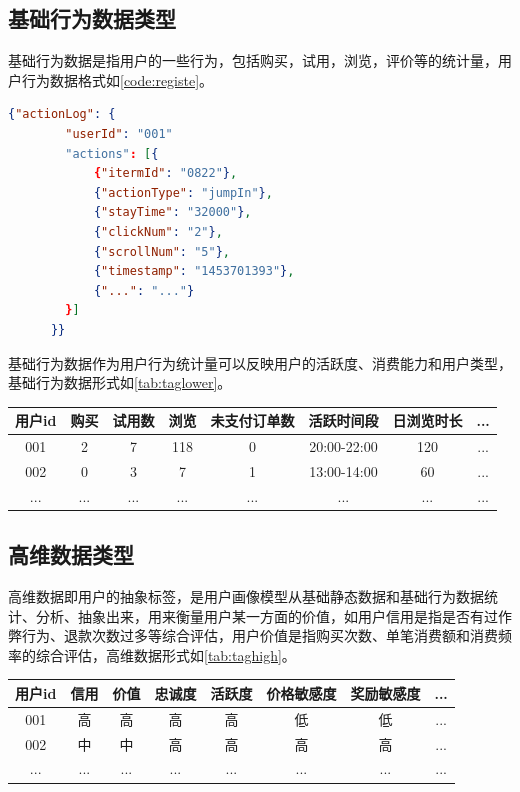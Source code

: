   \subsection{基础行为数据类型}
  基础行为数据是指用户的一些行为，包括购买，试用，浏览，评价等的统计量，用户行为数据格式如\autoref{code:registe}。
    \begin{lstlisting}[language=json,firstnumber=1,label={code:registe}]
      {"actionLog": {
        "userId": "001"
        "actions": [{
            {"itermId": "0822"},
            {"actionType": "jumpIn"},
            {"stayTime": "32000"},
            {"clickNum": "2"},
            {"scrollNum": "5"},
            {"timestamp": "1453701393"},
            {"...": "..."}
        }]
      }}
    \end{lstlisting}
  基础行为数据作为用户行为统计量可以反映用户的活跃度、消费能力和用户类型，基础行为数据形式如\autoref{tab:taglower}。
    \begin{table}[htp]
    \centering
    \label{tab:taglower}
    \begin{tabular}{|c|c|c|c|c|c|c|c|} \hline
     用户id & 购买 & 试用数 & 浏览 & 未支付订单数 & 活跃时间段 & 日浏览时长 & ... \\ \hline
     001 & 2 & 7 & 118 & 0 & 20:00-22:00 & 120 & ... \\ \hline
     002 & 0 & 3 & 7 & 1 & 13:00-14:00 & 60 & ... \\ \hline
     ... & ... & ... & ... & ... & ... & ... & ... \\ \hline
    \end{tabular}
    \end{table}

  \subsection{高维数据类型}
  高维数据即用户的抽象标签，是用户画像模型从基础静态数据和基础行为数据统计、分析、抽象出来，用来衡量用户某一方面的价值，如用户信用是指是否有过作弊行为、退款次数过多等综合评估，用户价值是指购买次数、单笔消费额和消费频率的综合评估，高维数据形式如\autoref{tab:taghigh}。
    \begin{table}[htp]
    \centering
    \label{tab:taghigh}
    \begin{tabular}{|c|c|c|c|c|c|c|c|} \hline
     用户id & 信用 & 价值 & 忠诚度 & 活跃度 & 价格敏感度 & 奖励敏感度 & ... \\ \hline
     001 & 高 & 高 & 高 & 高 & 低 & 低 & ... \\ \hline
     002 & 中 & 中 & 高 & 高 & 高 & 高 & ... \\ \hline
     ... & ... & ... & ... & ... & ... & ... & ... \\ \hline
    \end{tabular}
    \end{table}

